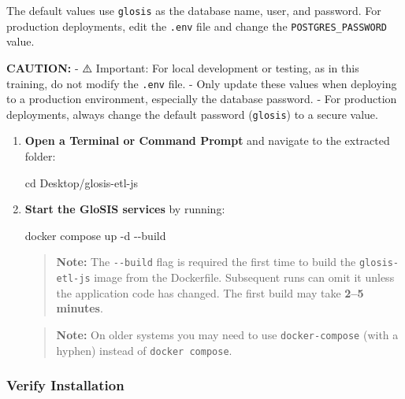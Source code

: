 \documentclass[
  10pt,
  b5paper,
  oneside]{book}
\newenvironment{Shaded}{\begin{snugshade}}{\end{snugshade}}
\newcommand{\AttributeTok}[1]{\textcolor[rgb]{0.13,0.29,0.53}{#1}}
\newcommand{\BuiltInTok}[1]{#1}
\newcommand{\ExtensionTok}[1]{#1}
\newcommand{\NormalTok}[1]{#1}
\begin{document}
The default values use \texttt{glosis} as the database name, user, and password. For production deployments, edit the \texttt{.env} file and change the \texttt{POSTGRES\_PASSWORD} value.

\textbf{CAUTION:}
- ⚠️ Important: For local development or testing, as in this training, do not modify the \texttt{.env} file.
- Only update these values when deploying to a production environment, especially the database password.
- For production deployments, always change the default password (\texttt{glosis}) to a secure value.

\begin{enumerate}
\def\labelenumi{\arabic{enumi}.}
\setcounter{enumi}{4}
\item
  \textbf{Open a Terminal or Command Prompt} and navigate to the extracted folder:

\begin{Shaded}
\begin{Highlighting}[]
\BuiltInTok{cd}\NormalTok{ Desktop/glosis{-}etl{-}js}
\end{Highlighting}
\end{Shaded}
\item
  \textbf{Start the GloSIS services} by running:

\begin{Shaded}
\begin{Highlighting}[]
\ExtensionTok{docker}\NormalTok{ compose up }\AttributeTok{{-}d} \AttributeTok{{-}{-}build}
\end{Highlighting}
\end{Shaded}

  \begin{quote}
  \textbf{Note:} The \texttt{-\/-build} flag is required the first time to build the \texttt{glosis-etl-js} image from the Dockerfile. Subsequent runs can omit it unless the application code has changed. The first build may take \textbf{2--5 minutes}.
  \end{quote}

  \begin{quote}
  \textbf{Note:} On older systems you may need to use \texttt{docker-compose} (with a hyphen) instead of \texttt{docker\ compose}.
  \end{quote}
\end{enumerate}

\subsubsection{Verify Installation}\label{verify-installation}
\end{document}
